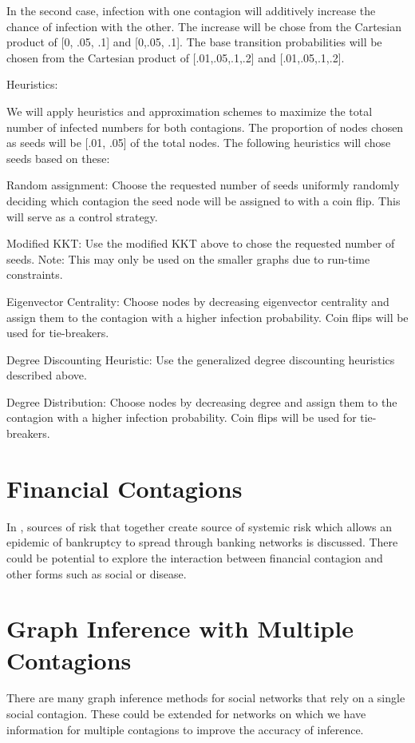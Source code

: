 \documentclass[11pt]{article}
\begin{document}
In the second case, infection with one contagion will additively increase the chance of infection with the other. The increase will be chose from the Cartesian product of [0, .05, .1] and [0,.05, .1]. The base transition probabilities will be chosen from the Cartesian product of [.01,.05,.1,.2] and [.01,.05,.1,.2].


Heuristics:


We will apply heuristics and approximation schemes to maximize the total number of infected numbers for both contagions. The proportion of nodes chosen as seeds will be [.01, .05] of the total nodes. The following heuristics will chose seeds based on these:


Random assignment: Choose the requested number of seeds uniformly randomly deciding which contagion the seed node will be assigned to with a coin flip. This will serve as a control strategy.


Modified KKT: Use the modified KKT above to chose the requested number of seeds. Note: This may only be used on the smaller graphs due to run-time constraints.


Eigenvector Centrality: Choose nodes by decreasing eigenvector centrality and assign them to the contagion with a higher infection probability. Coin flips will be used for tie-breakers. 


Degree Discounting Heuristic: Use the generalized degree discounting heuristics described above.


Degree Distribution: Choose nodes by decreasing degree and assign them to the contagion with a higher infection probability. Coin flips will be used for tie-breakers.

\section{Financial Contagions}

In \cite{Cacciolo}, sources of risk that together create
source of systemic risk which allows an epidemic of bankruptcy to
spread through banking networks is discussed. There could be potential
to explore the interaction between financial contagion and other
forms such as social or disease.

\section{Graph Inference with Multiple Contagions}

There are many graph inference methods for social networks that
rely on a single social contagion. These could be extended for
networks on which we have information for multiple contagions to
improve the accuracy of inference.





\end{document}
